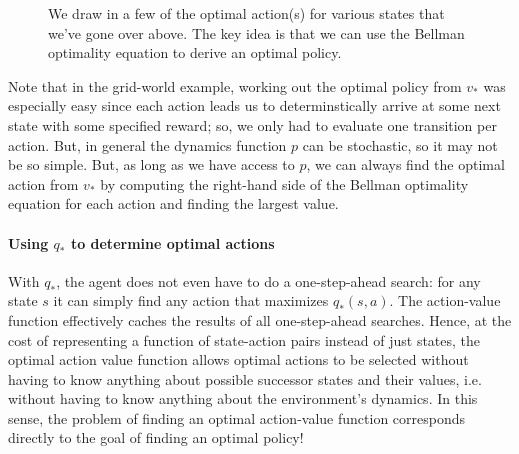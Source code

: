 \documentclass[12pt]{article}
\begin{document}
\begin{figure}[h]
  \centering
  \caption{\footnotesize We draw in a few of the optimal action(s) for various states that we've gone over above. The key idea is that we can use the Bellman optimality equation to derive an optimal policy.}
\end{figure}

Note that in the grid-world example, working out the optimal policy from $v_*$ was especially easy since each action leads us to determinstically arrive at some next state with some specified reward; so, we only had to evaluate one transition per action. But, in general the dynamics function $p$ can be stochastic, so it may not be so simple. But, as long as we have access to $p$,
we can always find the optimal action from $v_*$ by computing the right-hand side of the Bellman optimality equation for each action and finding the largest value. 

\paragraph{Using $q_*$ to determine optimal actions} With $q_*$, the agent does not even have to do a one-step-ahead search: for any state $s$ it can simply find any action that maximizes $q_*(s,a)$. The action-value function effectively caches the results of all one-step-ahead searches. Hence, at the cost of representing a function of state-action pairs instead of just states, the optimal action value function allows optimal actions to be selected without having to know anything about possible successor states and their values, i.e. without having to know anything about the environment's dynamics. In this sense, the problem of finding an optimal action-value function corresponds directly to the goal of finding an optimal policy!
\end{document}
